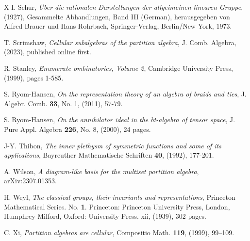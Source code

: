\documentclass[10pt,hidelinks]{article}
\numberwithin{equation}{section}
\begin{document}
\begin{thebibliography}{X}
I. Schur, \textit{ \"Uber die rationalen Darstellungen der allgeimeinen linearen Gruppe}, (1927),
Gesammelte Abhandlungen, Band III (German), herausgegeben von Alfred Brauer und
Hans Rohrbach, Springer-Verlag, Berlin/New York, 1973. 


T. Scrimshaw, {\it Cellular subalgebras of the partition algebra}, 
  J. Comb. Algebra,  (2023), published online first. 


  
R. Stanley, \textit{Enumerate {\it {\color{black}{c}}}ombinatorics, Volume 2},  
Cambridge University Press, (1999), pages 1-585.


S. Ryom-Hansen, \textit{On the representation theory of an algebra of braids and ties}, 
J. Algebr. Comb. {\bf 33}, No. 1, (2011), 57-79. 

S. Ryom-Hansen,
\textit{On the annihilator ideal in the bt-algebra of tensor space}, 
J. Pure Appl. Algebra {\bf 226}, No. 8, (2000), 24 pages. 
  


  
J-Y. Thibon, 
\textit{The inner plethysm of symmetric functions and some of its applications}, 
Bayreuther Mathematische Schriften {\bf 40}, (1992), 177-201. 



A. Wilson, \textit{A diagram-like basis for the multiset partition algebra}, arXiv:2307.01353. 


H. Weyl, \textit{The classical groups, their invariants and representations}, 
  Princeton Mathematical Series. No. {\bf 1}. Princeton: Princeton University Press, London, Humphrey Milford, Oxford:
  University Press. xii, (1939), 302 pages. 


  
  
C. Xi, \textit{ Partition algebras are cellular}, Compositio Math. {\bf 119}, (1999), 99–109.





\end{thebibliography}

 
\end{document}
